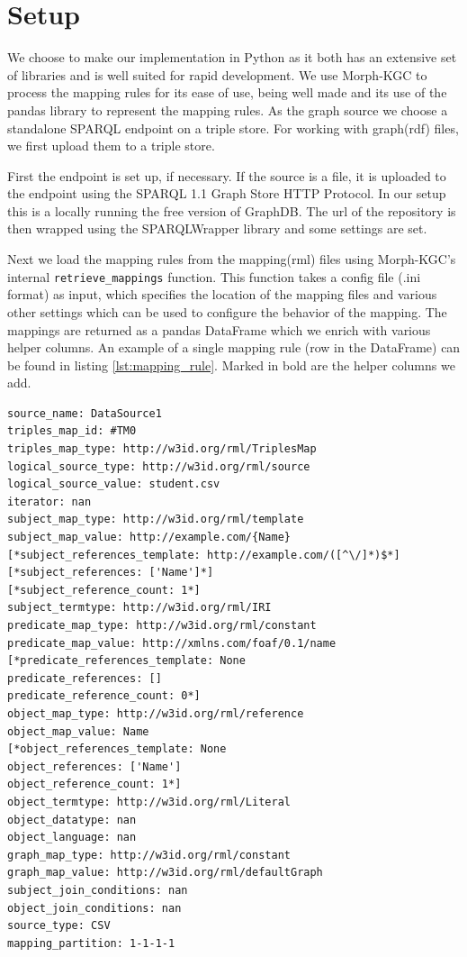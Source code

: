 
\section{Setup}

We choose to make our implementation in Python as it both has an extensive set of libraries and is well suited for rapid development. We use Morph-KGC to process the mapping rules for its ease of use, being well made and its use of the pandas library to represent the mapping rules. As the graph source we choose a standalone SPARQL endpoint on a triple store. For working with graph(\acrshort{rdf}) files, we first upload them to a triple store.

First the endpoint is set up, if necessary. If the source is a file, it is uploaded to the endpoint using the SPARQL 1.1 Graph Store HTTP Protocol. In our setup this is a locally running the free version of GraphDB. The url of the repository is then wrapped using the SPARQLWrapper library and some settings are set.

Next we load the mapping rules from the mapping(\acrshort{rml}) files using Morph-KGC's internal \texttt{retrieve\_mappings} function. This function takes a config file (.ini format) as input, which specifies the location of the mapping files and various other settings which can be used to configure the behavior of the mapping. The mappings are returned as a pandas DataFrame which we enrich with various helper columns. An example of a single mapping rule (row in the DataFrame) can be found in listing \ref{lst:mapping_rule}. Marked in bold are the helper columns we add.

\begin{lstlisting}[caption={Example of a mapping rule in Morph-KGC}, label={lst:mapping_rule}, captionpos=b, basicstyle=\small]
source_name: DataSource1
triples_map_id: #TM0
triples_map_type: http://w3id.org/rml/TriplesMap
logical_source_type: http://w3id.org/rml/source
logical_source_value: student.csv
iterator: nan
subject_map_type: http://w3id.org/rml/template
subject_map_value: http://example.com/{Name}
[*subject_references_template: http://example.com/([^\/]*)$*]
[*subject_references: ['Name']*]
[*subject_reference_count: 1*]
subject_termtype: http://w3id.org/rml/IRI
predicate_map_type: http://w3id.org/rml/constant
predicate_map_value: http://xmlns.com/foaf/0.1/name
[*predicate_references_template: None
predicate_references: []
predicate_reference_count: 0*]
object_map_type: http://w3id.org/rml/reference
object_map_value: Name
[*object_references_template: None
object_references: ['Name']
object_reference_count: 1*]
object_termtype: http://w3id.org/rml/Literal
object_datatype: nan
object_language: nan
graph_map_type: http://w3id.org/rml/constant
graph_map_value: http://w3id.org/rml/defaultGraph
subject_join_conditions: nan
object_join_conditions: nan
source_type: CSV
mapping_partition: 1-1-1-1
\end{lstlisting}

